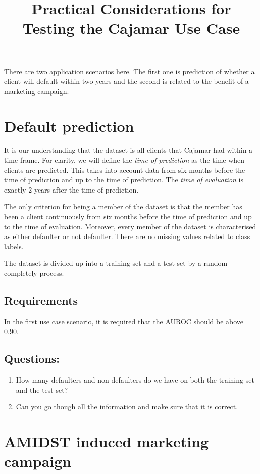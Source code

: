 \documentclass{article}
\title{Practical Considerations for Testing the Cajamar Use Case}
\date{}
\theoremstyle{theorem}
\theoremstyle{definition}
\begin{document}
\maketitle

There are two application scenarios here.  The first one is prediction of whether a client will default within two years and the second is related to the benefit of a marketing campaign.

\section{Default prediction}

It is our understanding that the dataset is all clients that Cajamar had within a time frame.  For clarity, we will define the \emph{time of prediction} as the time when clients are predicted.  This takes into account data from six months before the time of prediction and up to the time of prediction.  The \emph{time of evaluation} is exactly 2 years after the time of prediction.  

The only criterion for being a member of the dataset is that the member has been a client continuously from six months before the time of prediction and up to the time of evaluation.  Moreover, every member of the dataset is characterised as either defaulter or not defaulter.  There are no missing values related to class labels.

The dataset is divided up into a training set and a test set by a random completely process.

\subsection*{Requirements}

In the first use case scenario, it is required that the AUROC should be above 0.90.
 
\subsection*{Questions: }
\begin{enumerate}
\item How many defaulters and non defaulters do we have on both the training set and the test set?
\item Can you go though all the information and make sure that it is correct.
\end{enumerate}


\section{AMIDST induced marketing campaign}
\end{document}
